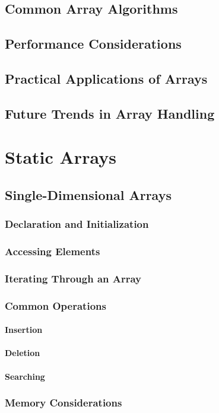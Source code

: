 \documentclass[12pt, oneside]{book}
\begin{document}
\section{Common Array Algorithms}
\section{Performance Considerations}
\section{Practical Applications of Arrays}
\section{Future Trends in Array Handling}

\chapter{Static Arrays}
	\section{Single-Dimensional Arrays}
	\subsection{Declaration and Initialization}
	\subsection{Accessing Elements}
	\subsection{Iterating Through an Array}
	\subsection{Common Operations}
	\subsubsection{Insertion}
	\subsubsection{Deletion}
	\subsubsection{Searching}
	\subsection{Memory Considerations}
\end{document}
